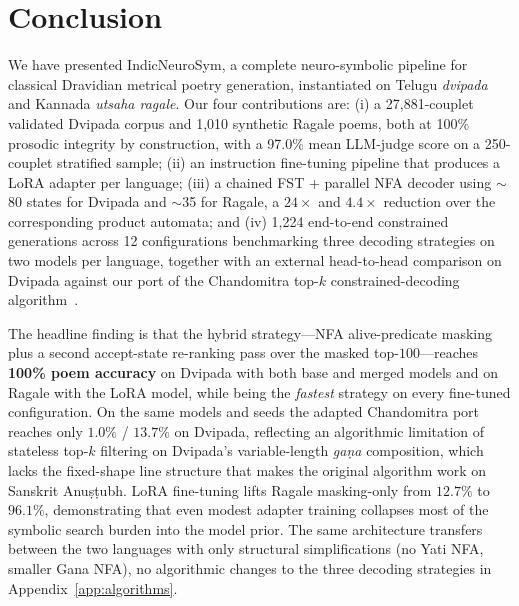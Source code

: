 \documentclass[11pt]{article}
\begin{document}
\section{Conclusion}
\label{sec:conclusion}

We have presented IndicNeuroSym, a complete neuro-symbolic pipeline for
classical Dravidian metrical poetry generation, instantiated on Telugu
\textit{dvipada} and Kannada \textit{utsaha ragale}. Our four contributions
are: (i) a 27,881-couplet validated Dvipada corpus and 1,010 synthetic
Ragale poems, both at 100\% prosodic integrity by construction, with a
97.0\% mean LLM-judge score on a 250-couplet stratified sample; (ii) an
instruction fine-tuning pipeline that produces a LoRA
adapter per language; (iii) a chained FST + parallel NFA decoder using
$\sim$80 states for Dvipada and $\sim$35 for Ragale, a $24\times$ and
$4.4\times$ reduction over the corresponding product automata; and (iv)
1,224 end-to-end constrained generations across 12 configurations
benchmarking three decoding strategies on two models per language,
together with an external head-to-head comparison on Dvipada against
our port of the Chandomitra top-$k$ constrained-decoding
algorithm~\citep{jagadeeshan2026chandomitra}.

The headline finding is that the hybrid strategy---NFA alive-predicate
masking plus a second accept-state re-ranking pass over the masked
top-$100$---reaches \textbf{100\% poem accuracy} on Dvipada with both
base and merged models and on Ragale with the LoRA model, while being
the \emph{fastest} strategy on every fine-tuned configuration. On the same models and
seeds the adapted Chandomitra port reaches only $1.0\%$ / $13.7\%$ on
Dvipada, reflecting an algorithmic limitation of stateless top-$k$
filtering on Dvipada's variable-length \textit{ga\d{n}a} composition,
which lacks the fixed-shape line structure that makes the original
algorithm work on Sanskrit Anu\d{s}\d{t}ubh. LoRA fine-tuning lifts Ragale
masking-only from $12.7\%$ to $96.1\%$, demonstrating that even modest
adapter training collapses most of the symbolic search burden into the
model prior. The same architecture transfers between the two languages
with only structural simplifications (no Yati NFA, smaller Gana NFA), no
algorithmic changes to the three decoding strategies in
Appendix~\ref{app:algorithms}.
\end{document}
